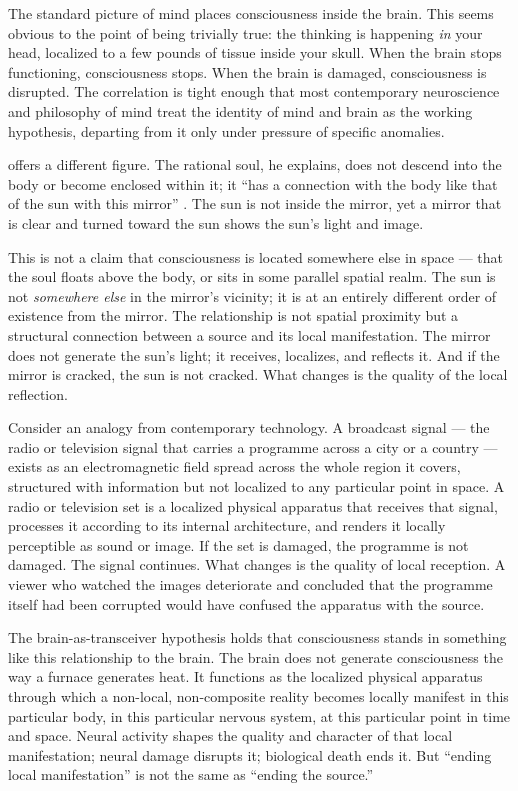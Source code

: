 The standard picture of mind places consciousness inside the brain. This seems
obvious to the point of being trivially true: the thinking is happening \emph{in}
your head, localized to a few pounds of tissue inside your skull. When the
brain stops functioning, consciousness stops. When the brain is damaged,
consciousness is disrupted. The correlation is tight enough that most
contemporary neuroscience and philosophy of mind treat the identity of mind and
brain as the working hypothesis, departing from it only under pressure of
specific anomalies.

\AbdulBaha offers a different figure. The rational soul, he explains, does not
descend into the body or become enclosed within it; it ``has a connection with
the body like that of the sun with this mirror'' \citep[Ch.~68]{SAQ}. The sun is
not inside the mirror, yet a mirror that is clear and turned toward the sun
shows the sun's light and image.

This is not a claim that consciousness is located somewhere else in space ---
that the soul floats above the body, or sits in some parallel spatial realm.
The sun is not \emph{somewhere else} in the mirror's vicinity; it is at an
entirely different order of existence from the mirror. The relationship is not
spatial proximity but a structural connection between a source and its local
manifestation. The mirror does not generate the sun's light; it receives,
localizes, and reflects it. And if the mirror is cracked, the sun is not
cracked. What changes is the quality of the local reflection.

Consider an analogy from contemporary technology. A broadcast signal --- the
radio or television signal that carries a programme across a city or a country
--- exists as an electromagnetic field spread across the whole region it
covers, structured with information but not localized to any particular point
in space. A radio or television set
is a localized physical apparatus that receives that signal, processes it
according to its internal architecture, and renders it locally perceptible as
sound or image. If the set is damaged, the programme is not damaged. The signal
continues. What changes is the quality of local reception. A viewer who watched
the images deteriorate and concluded that the programme itself had been corrupted
would have confused the apparatus with the source.

The brain-as-transceiver hypothesis holds that consciousness stands in
something like this relationship to the brain. The brain does not generate
consciousness the way a furnace generates heat. It functions as the localized
physical apparatus through which a non-local, non-composite reality becomes
locally manifest in this particular body, in this particular nervous system, at
this particular point in time and space. Neural activity shapes the quality and
character of that local manifestation; neural damage disrupts it; biological
death ends it. But ``ending local manifestation'' is not the same as ``ending
the source.''

